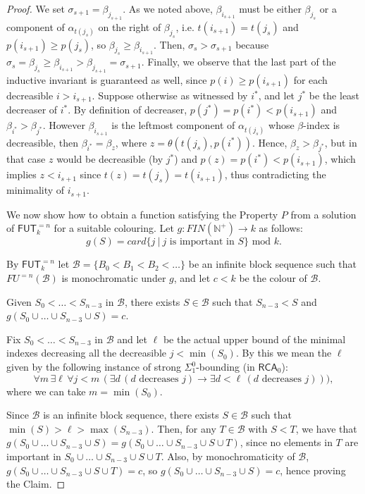 \documentclass[10pt,a4paper]{amsart}
\newcommand\FUT{\mathsf{FUT}}
\newcommand\Nat{\mathbb{N}}
\newcommand\RCA{\mathsf{RCA}}
\begin{document}
\begin{proof}
We set $\sigma_{s+1} = \beta_{j_{s+1}}$. As we noted above, $\beta_{i_{s+1}}$ must be either $\beta_{j_s}$ or a component of $\alpha_{t(j_s)}$ on the right of $\beta_{j_s}$, i.e. $t(i_{s+1}) = t(j_s)$ and $p(i_{s+1}) \geq p(j_s)$, so $\beta_{j_s} \geq \beta_{i_{s+1}}$. Then, $\sigma_s > \sigma_{s+1}$ because $\sigma_s = \beta_{j_s} \geq \beta_{i_{s+1}} > \beta_{j_{s+1}} = \sigma_{s+1}$. Finally, we observe that the last part of the inductive invariant is guaranteed as well, since $p(i) \geq p(i_{s+1})$ for each decreasible $i>i_{s+1}$. 
Suppose otherwise as witnessed by $i^*$, and let $j^*$ be the least decreaser of $i^*$. By definition of decreaser, $p(j^*) = p(i^*) < p(i_{s+1})$ and $\beta_{i^*} > \beta_{j^*}$. However $\beta_{i_{s+1}}$ is the leftmost component of $\alpha_{t(j_s)}$ whose $\beta$-index is decreasible, then $\beta_{i^*} = \beta_z$, where $z = \theta({t(j_s)},p(i^*))$. Hence, $\beta_z > \beta_{j^*}$, but in that case $z$ would be decreasible (by $j^*$) and $p(z) = p(i^*) < p(i_{s+1})$, which implies $z < i_{s+1}$ since $t(z)=t(j_s)=t(i_{s+1})$, thus contradicting the minimality of $i_{s+1}$.


\bigskip
We now show how to obtain a function satisfying the Property $P$ from a solution of $\FUT^{=n}_k$ for
a suitable colouring. Let $g: FIN(\Nat^+) \rightarrow k$ as follows:
$$
g(S) = card\{j\ |\ j \text{ is important in }  S\} \text{ mod } k.
$$

\medskip

By $\FUT^{=n}_k$ let $\mathcal{B} = \{B_0 < B_1 < B_2 < \ldots\}$ be an infinite block sequence such that $FU^{=n}(\mathcal{B})$ is monochromatic under $g$, and let $c<k$ be the colour of $\mathcal{B}$.

\begin{claim} \label{clm:shorter-union}
Given $S_0\!<\!\ldots\!<\!S_{n-3}$ in $\mathcal{B}$, there exists $S \in \mathcal{B}$ such that $S_{n-3} < S$ and $g(S_0 \cup \ldots \cup S_{n-3} \cup S) = c$.
\end{claim}

Fix $S_0<\ldots<S_{n-3}$ in $\mathcal{B}$ and let $\ell$ be the actual upper bound of the minimal indexes decreasing all the decreasible $j < \min(S_0)$. By this we mean the $\ell$ given by the following instance of strong $\Sigma^0_1$-bounding (in $\RCA_0$): 
$$
\forall m \,\exists \ell \,\forall j < m \,( \exists d \,(d \text{ decreases } j) \to \exists d < \ell \,(d \text{ decreases } j))),
$$
where we can take $m=\min(S_0)$. 

Since $\mathcal{B}$ is an infinite block sequence, there exists $S \in \mathcal{B}$ such that $\min(S) > \ell > \max(S_{n-3})$. Then, for any $T \in \mathcal{B}$ with $S < T$, we have that $g(S_0 \cup \ldots \cup S_{n-3} \cup S) = g(S_0 \cup \ldots \cup S_{n-3} \cup S \cup T)$, since no elements in $T$ are important in $S_0 \cup \ldots \cup S_{n-3} \cup S \cup T$. Also, by monochromaticity of $\mathcal{B}$, $g(S_0 \cup \ldots \cup S_{n-3} \cup S \cup T) = c$, so $g(S_0 \cup \ldots \cup S_{n-3} \cup S) = c$, hence proving the Claim.


\end{proof}
\end{document}
